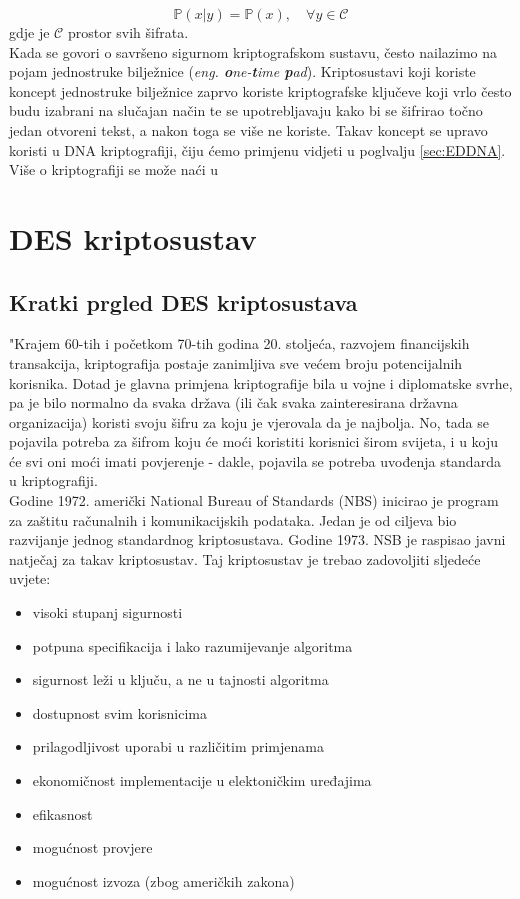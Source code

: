 \documentclass[a4paper,oneside,12pt]{memoir} %
\begin{document}
\begin{spacing}{1.5}
\[\mathbb{P}(x|y)=\mathbb{P}(x), \quad \forall	 y \in \mathcal{C}\] 
gdje je $\mathcal{C}$ prostor svih šifrata.\\ 
Kada se govori o savršeno sigurnom kriptografskom sustavu, često nailazimo na pojam jednostruke bilježnice (\textit{eng. \textbf{o}ne-\textbf{t}ime \textbf{p}ad}). Kriptosustavi koji koriste koncept jednostruke bilježnice zaprvo koriste kriptografske ključeve koji vrlo često budu izabrani na slučajan način te se upotrebljavaju kako bi se šifrirao točno jedan otvoreni tekst, a nakon toga se više ne koriste. Takav koncept se upravo koristi u DNA kriptografiji, čiju ćemo primjenu vidjeti u poglvalju \ref{sec:EDDNA}.
Više o kriptografiji se može naći u \cite{duje}
\section{DES kriptosustav}	
\subsection{Kratki prgled DES kriptosustava}
"Krajem 60-tih i početkom 70-tih godina 20. stoljeća, razvojem financijskih transakcija, kriptografija postaje zanimljiva sve većem broju potencijalnih korisnika. Dotad je glavna primjena kriptografije bila u vojne i diplomatske svrhe, pa je bilo normalno da svaka država (ili čak svaka zainteresirana državna organizacija) koristi svoju šifru za koju je vjerovala da je najbolja. No, tada se pojavila potreba za šifrom koju će moći koristiti korisnici širom svijeta, i u koju će svi oni moći imati povjerenje - dakle, pojavila se potreba uvođenja standarda u kriptografiji.\\
Godine 1972. američki National Bureau of Standards (NBS) inicirao je program za zaštitu računalnih i komunikacijskih podataka. Jedan je od ciljeva bio razvijanje jednog standardnog kriptosustava. Godine 1973. NSB je raspisao javni natječaj za takav kriptosustav. Taj kriptosustav je trebao zadovoljiti sljedeće uvjete:
\begin{itemize}
\item visoki stupanj sigurnosti
\item potpuna specifikacija i lako razumijevanje algoritma
\item sigurnost leži u ključu, a ne u tajnosti algoritma
\item dostupnost svim korisnicima
\item prilagodljivost uporabi u različitim primjenama
\item ekonomičnost implementacije u elektoničkim uređajima
\item efikasnost
\item mogućnost provjere
\item mogućnost izvoza (zbog američkih zakona)
\end{itemize}


\end{spacing}
\end{document}
